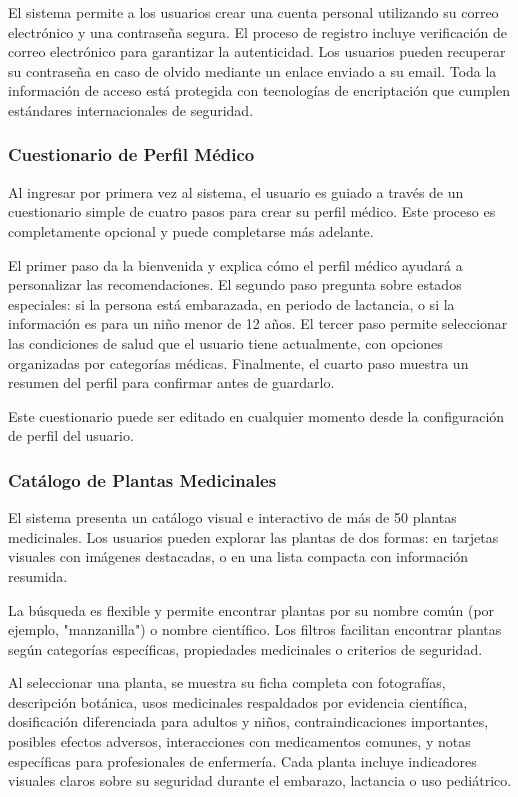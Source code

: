 \documentclass[12pt,a4paper]{article}
\begin{document}
El sistema permite a los usuarios crear una cuenta personal utilizando su correo electrónico y una contraseña segura. El proceso de registro incluye verificación de correo electrónico para garantizar la autenticidad. Los usuarios pueden recuperar su contraseña en caso de olvido mediante un enlace enviado a su email. Toda la información de acceso está protegida con tecnologías de encriptación que cumplen estándares internacionales de seguridad.

\subsubsection{Cuestionario de Perfil Médico}

Al ingresar por primera vez al sistema, el usuario es guiado a través de un cuestionario simple de cuatro pasos para crear su perfil médico. Este proceso es completamente opcional y puede completarse más adelante.

El primer paso da la bienvenida y explica cómo el perfil médico ayudará a personalizar las recomendaciones. El segundo paso pregunta sobre estados especiales: si la persona está embarazada, en periodo de lactancia, o si la información es para un niño menor de 12 años. El tercer paso permite seleccionar las condiciones de salud que el usuario tiene actualmente, con opciones organizadas por categorías médicas. Finalmente, el cuarto paso muestra un resumen del perfil para confirmar antes de guardarlo.

Este cuestionario puede ser editado en cualquier momento desde la configuración de perfil del usuario.

\subsubsection{Catálogo de Plantas Medicinales}

El sistema presenta un catálogo visual e interactivo de más de 50 plantas medicinales. Los usuarios pueden explorar las plantas de dos formas: en tarjetas visuales con imágenes destacadas, o en una lista compacta con información resumida.

La búsqueda es flexible y permite encontrar plantas por su nombre común (por ejemplo, "manzanilla") o nombre científico. Los filtros facilitan encontrar plantas según categorías específicas, propiedades medicinales o criterios de seguridad.

Al seleccionar una planta, se muestra su ficha completa con fotografías, descripción botánica, usos medicinales respaldados por evidencia científica, dosificación diferenciada para adultos y niños, contraindicaciones importantes, posibles efectos adversos, interacciones con medicamentos comunes, y notas específicas para profesionales de enfermería. Cada planta incluye indicadores visuales claros sobre su seguridad durante el embarazo, lactancia o uso pediátrico.
\end{document}
